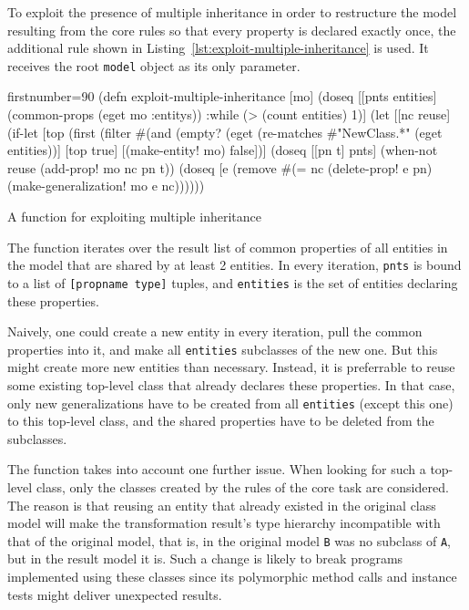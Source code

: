 \documentclass[11pt]{article}
\begin{document}
To exploit the presence of multiple inheritance in order to restructure the
model resulting from the core rules so that every property is declared exactly
once, the additional rule shown in
Listing~\ref{lst:exploit-multiple-inheritance} is used.  It receives the root
\verb|model| object as its only parameter.

\begin{listing}[htbp]
  \begin{clojurecode*}{firstnumber=90}
(defn exploit-multiple-inheritance [mo]
  (doseq [[pnts entities] (common-props (eget mo :entitys))
          :while (> (count entities) 1)]
    (let [[nc reuse]
          (if-let [top (first (filter
                               #(and (empty? (eget %
                                     (re-matches #"NewClass.*" (eget %
                               entities))]
            [top true]
            [(make-entity! mo) false])]
      (doseq [[pn t] pnts]
        (when-not reuse
          (add-prop! mo nc pn t))
        (doseq [e (remove #(= nc %
          (delete-prop! e pn)
          (make-generalization! mo e nc))))))
  \end{clojurecode*}
  \caption{A function for exploiting multiple inheritance}
    \label{lst:exploit-multiple-inheritance}
\end{listing}

\begin{sloppypar}
  The function iterates over the result list of common properties of all
  entities in the model that are shared by at least 2 entities.  In every
  iteration, \verb|pnts| is bound to a list of \verb|[propname type]| tuples,
  and \verb|entities| is the set of entities declaring these properties.
\end{sloppypar}

Naively, one could create a new entity in every iteration, pull the common
properties into it, and make all \verb|entities| subclasses of the new one.
But this might create more new entities than necessary.  Instead, it is
preferrable to reuse some existing top-level class that already declares these
properties.  In that case, only new generalizations have to be created from all
\verb|entities| (except this one) to this top-level class, and the shared
properties have to be deleted from the subclasses.

The function takes into account one further issue.  When looking for such a
top-level class, only the classes created by the rules of the core task are
considered.  The reason is that reusing an entity that already existed in the
original class model will make the transformation result's type hierarchy
incompatible with that of the original model, that is, in the original model
\verb|B| was no subclass of \verb|A|, but in the result model it is.  Such a
change is likely to break programs implemented using these classes since its
polymorphic method calls and instance tests might deliver unexpected results.
\end{document}
